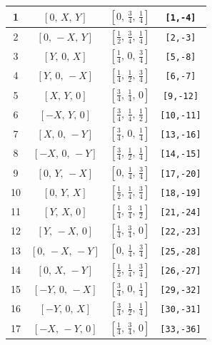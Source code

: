 \documentclass[fleqn,8pt]{jsarticle}
\begin{document}
\begin{longtable}{cccc}
1 & $\left[ 0,\, X,\, Y \right]$ & $\left[ 0,\, \frac{3}{4},\, \frac{1}{4} \right]$ & {\tt [1,-4]} \\ \hline
2 & $\left[ 0,\, - X,\, Y \right]$ & $\left[ \frac{1}{2},\, \frac{3}{4},\, \frac{1}{4} \right]$ & {\tt [2,-3]} \\ \hline
3 & $\left[ Y,\, 0,\, X \right]$ & $\left[ \frac{1}{4},\, 0,\, \frac{3}{4} \right]$ & {\tt [5,-8]} \\ \hline
4 & $\left[ Y,\, 0,\, - X \right]$ & $\left[ \frac{1}{4},\, \frac{1}{2},\, \frac{3}{4} \right]$ & {\tt [6,-7]} \\ \hline
5 & $\left[ X,\, Y,\, 0 \right]$ & $\left[ \frac{3}{4},\, \frac{1}{4},\, 0 \right]$ & {\tt [9,-12]} \\ \hline
6 & $\left[ - X,\, Y,\, 0 \right]$ & $\left[ \frac{3}{4},\, \frac{1}{4},\, \frac{1}{2} \right]$ & {\tt [10,-11]} \\ \hline
7 & $\left[ X,\, 0,\, - Y \right]$ & $\left[ \frac{3}{4},\, 0,\, \frac{1}{4} \right]$ & {\tt [13,-16]} \\ \hline
8 & $\left[ - X,\, 0,\, - Y \right]$ & $\left[ \frac{3}{4},\, \frac{1}{2},\, \frac{1}{4} \right]$ & {\tt [14,-15]} \\ \hline
9 & $\left[ 0,\, Y,\, - X \right]$ & $\left[ 0,\, \frac{1}{4},\, \frac{3}{4} \right]$ & {\tt [17,-20]} \\ \hline
10 & $\left[ 0,\, Y,\, X \right]$ & $\left[ \frac{1}{2},\, \frac{1}{4},\, \frac{3}{4} \right]$ & {\tt [18,-19]} \\ \hline
11 & $\left[ Y,\, X,\, 0 \right]$ & $\left[ \frac{1}{4},\, \frac{3}{4},\, \frac{1}{2} \right]$ & {\tt [21,-24]} \\ \hline
12 & $\left[ Y,\, - X,\, 0 \right]$ & $\left[ \frac{1}{4},\, \frac{3}{4},\, 0 \right]$ & {\tt [22,-23]} \\ \hline
13 & $\left[ 0,\, - X,\, - Y \right]$ & $\left[ 0,\, \frac{1}{4},\, \frac{3}{4} \right]$ & {\tt [25,-28]} \\ \hline
14 & $\left[ 0,\, X,\, - Y \right]$ & $\left[ \frac{1}{2},\, \frac{1}{4},\, \frac{3}{4} \right]$ & {\tt [26,-27]} \\ \hline
15 & $\left[ - Y,\, 0,\, - X \right]$ & $\left[ \frac{3}{4},\, 0,\, \frac{1}{4} \right]$ & {\tt [29,-32]} \\ \hline
16 & $\left[ - Y,\, 0,\, X \right]$ & $\left[ \frac{3}{4},\, \frac{1}{2},\, \frac{1}{4} \right]$ & {\tt [30,-31]} \\ \hline
17 & $\left[ - X,\, - Y,\, 0 \right]$ & $\left[ \frac{1}{4},\, \frac{3}{4},\, 0 \right]$ & {\tt [33,-36]} \\ \hline

\end{longtable}
\end{document}
